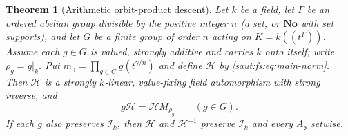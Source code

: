 \documentclass[11pt]{article}
\newtheorem{theorem}{Theorem}[section]
\theoremstyle{definition}
\theoremstyle{remark}
\newcommand{\No}{\mathbf{No}}
\newcommand{\Ineg}{\mathcal I}
\numberwithin{equation}{section}
\begin{document}
\begin{theorem}[Arithmetic orbit-product descent]\label{saut:gr:thm:orbit}
Let $k$ be a field, let $\Gamma$ be an ordered abelian group divisible by the positive
integer $n$ (a set, or $\No$ with set supports), and let $G$ be a finite group of order
$n$ acting on $K=k((t^\Gamma))$. Assume each $g\in G$ is valued, strongly additive and
carries $k$ onto itself; write $\rho_g=g|_k$. Put
$m_\gamma=\prod_{g\in G}g(t^{\gamma/n})$ and define $\mathcal H$ by
\eqref{saut:fs:eq:main-norm}. Then $\mathcal H$ is a strongly $k$-linear, value-fixing
field automorphism with strong inverse, and
\begin{equation}\label{saut:gr:eq:intertwine}
 g\mathcal H=\mathcal HM_{\rho_g}\qquad(g\in G).
\end{equation}
If each $g$ also preserves $\Ineg_k$, then $\mathcal H$ and $\mathcal H^{-1}$ preserve
$\Ineg_k$ and every $A_{\mathfrak o}$ setwise.
\end{theorem}
\end{document}

